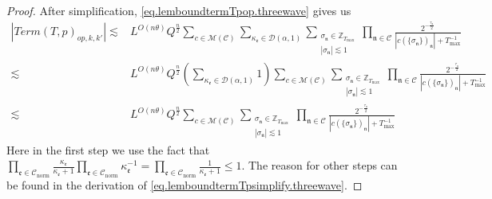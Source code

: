 \begin{proof}
After simplification, \eqref{eq.lemboundtermTpop.threewave} gives us 
\begin{equation}
\begin{split}
    |Term(T, p)_{op,k,k'}|\lesssim &L^{O(n\theta)} Q^{\frac{n}{2}}\sum_{c\in \mathscr{M}(\mathcal{C}) }\sum_{\kappa_{\mathfrak{e}}\in \mathcal{D}(\alpha,1)}\sum_{\substack{\sigma_{\mathfrak{n}}\in \mathbb{Z}_{T_{\text{max}}}\\ |\sigma_{\mathfrak{n}}|\lesssim 1}} \prod_{\mathfrak{n}\in \mathcal{C}}\frac{2^{-\frac{\tau_{\mathfrak{n}}}{2}}}{|c(\{\sigma_{\mathfrak{n}}\})_{\mathfrak{n}}|+T^{-1}_{\text{max}}}
    \\
    \lesssim &L^{O(n\theta)} Q^{\frac{n}{2}} \left(\sum_{\kappa_{\mathfrak{e}}\in \mathcal{D}(\alpha,1)} 1\right) \sum_{c\in \mathscr{M}(\mathcal{C})}\sum_{\substack{\sigma_{\mathfrak{n}}\in \mathbb{Z}_{T_{\text{max}}}\\ |\sigma_{\mathfrak{n}}|\lesssim 1}} \prod_{\mathfrak{n}\in \mathcal{C}}\frac{2^{-\frac{\tau_{\mathfrak{n}}}{2}}}{|c(\{\sigma_{\mathfrak{n}}\})_{\mathfrak{n}}|+T^{-1}_{\text{max}}}
    \\
    \lesssim & L^{O(n\theta)} Q^{\frac{n}{2}} \sum_{c\in \mathscr{M}(\mathcal{C})}\sum_{\substack{\sigma_{\mathfrak{n}}\in \mathbb{Z}_{T_{\text{max}}}\\ |\sigma_{\mathfrak{n}}|\lesssim 1}} \prod_{\mathfrak{n}\in \mathcal{C}}\frac{2^{-\frac{\tau_{\mathfrak{n}}}{2}}}{|c(\{\sigma_{\mathfrak{n}}\})_{\mathfrak{n}}|+T^{-1}_{\text{max}}}
\end{split}
\end{equation}
Here in the first step we use the fact that $\prod_{\mathfrak{e}\in \mathcal{C}_{\text{norm}}} \frac{\kappa_{\mathfrak{e}}}{\kappa_{\mathfrak{e}}+1} \prod_{\mathfrak{e}\in \mathcal{C}_{\text{norm}}} \kappa_{\mathfrak{e}}^{-1}=\prod_{\mathfrak{e}\in \mathcal{C}_{\text{norm}}} \frac{1}{\kappa_{\mathfrak{e}}+1}\le 1$. The reason for other steps can be found in the derivation of \eqref{eq.lemboundtermTpsimplify.threewave}.


\end{proof}
